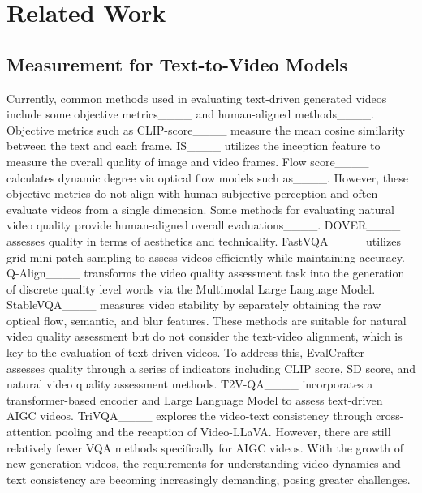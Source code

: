 \section{Related Work}
\subsection{Measurement for Text-to-Video Models}
Currently, common methods used in evaluating text-driven generated videos include some objective metrics____ and human-aligned methods____.
Objective metrics such as CLIP-score____ measure the mean cosine similarity between the text and each frame. IS____ utilizes the inception feature to measure the overall quality of image and video frames. Flow score____ calculates dynamic degree via optical flow models such as____.
However, these objective metrics do not align with human subjective perception and often evaluate videos from a single dimension. Some methods for evaluating natural video quality provide human-aligned overall evaluations____. 
DOVER____ assesses quality in terms of aesthetics and technicality. 
FastVQA____ utilizes grid mini-patch sampling to assess videos efficiently while maintaining accuracy.
Q-Align____ transforms the video quality assessment task into the generation of discrete quality level words via the Multimodal Large Language Model.
StableVQA____ measures video stability by separately obtaining the raw optical flow, semantic, and blur features.
These methods are suitable for natural video quality assessment but do not consider the text-video alignment, which is key to the evaluation of text-driven videos.
To address this, EvalCrafter____ assesses quality through a series of indicators including CLIP score, SD score, and natural video quality assessment methods. 
T2V-QA____ incorporates a transformer-based encoder and Large Language Model to assess text-driven AIGC videos.
TriVQA____ explores the video-text consistency through cross-attention pooling and the recaption of Video-LLaVA. 
However, there are still relatively fewer VQA methods specifically for AIGC videos. With the growth of new-generation videos, the requirements for understanding video dynamics and text consistency are becoming increasingly demanding, posing greater challenges.


